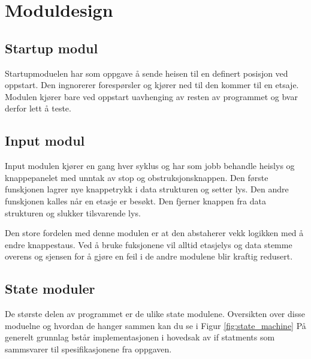 \chapter{Moduldesign}

\section{Startup modul}
Startupmoduelen har som oppgave å sende heisen til en definert posisjon ved oppstart. Den ingnorerer forespørsler og kjører ned til den kommer til en etsaje. Modulen kjører bare ved oppstart uavhenging av resten av programmet og bvar derfor lett å teste.

\section{Input modul}
Input modulen kjører en gang hver syklus og har som jobb behandle heislys og knappepanelet med unntak av stop og obstruksjonsknappen. Den første funskjonen lagrer nye knappetrykk i data strukturen og setter lys. Den andre funskjonen kalles når en etasje er besøkt. Den fjerner knappen fra data strukturen og slukker tilsvarende lys. 

Den store fordelen med denne modulen er at den abstaherer vekk logikken med å endre knappestaus. Ved å bruke fuksjonene vil alltid etasjelys og data stemme overens og sjensen for å gjøre en feil i de andre modulene blir kraftig redusert. 

\section{State moduler}
De største delen av programmet er de ulike state modulene. Oversikten over disse moduelne og hvordan de hanger sammen kan du se i Figur \ref{fig:state_machine} På generelt grunnlag bstår implementasjonen i hovedsak av if statments som sammsvarer til spesifikasjonene fra oppgaven.

